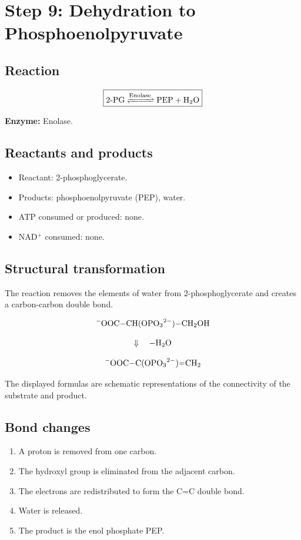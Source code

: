 \documentclass[11pt,a4paper]{article}
\newcommand{\Enz}[1]{\textbf{Enzyme:} #1}
\begin{document}
\section{Step 9: Dehydration to Phosphoenolpyruvate}
\label{step:9}

\subsection{Reaction}

\[
\boxed{
\ce{
2-PG
<=>[Enolase]
PEP + H2O
}
}
\]

\Enz{Enolase.}

\subsection{Reactants and products}

\begin{itemize}
  \item Reactant: 2-phosphoglycerate.
  \item Products: phosphoenolpyruvate (PEP), water.
  \item ATP consumed or produced: none.
  \item NAD$^+$ consumed: none.
\end{itemize}

\subsection{Structural transformation}

The reaction removes the elements of water from 2-phosphoglycerate
and creates a carbon-carbon double bond.

\[
\ce{
^-OOC-CH(OPO3^{2-})-CH2OH
}
\]

\[
\Downarrow\quad -\ce{H2O}
\]

\[
\ce{
^-OOC-C(OPO3^{2-})=CH2
}
\]

The displayed formulas are schematic representations of the
connectivity of the substrate and product.

\subsection{Bond changes}

\begin{enumerate}
  \item A proton is removed from one carbon.
  \item The hydroxyl group is eliminated from the adjacent carbon.
  \item The electrons are redistributed to form the C=C double bond.
  \item Water is released.
  \item The product is the enol phosphate PEP.
\end{enumerate}
\end{document}
